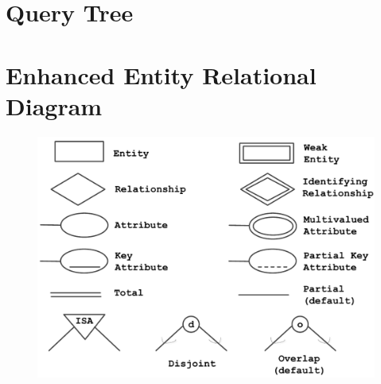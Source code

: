 \documentclass[8pt,a4paper,landscape]{extarticle}
\begin{document}
\begin{multicols*}{3}
\section*{Query Tree}

\section*{Enhanced Entity Relational Diagram}
\begin{figure}[H]
  \centering
  \includegraphics[width=0.75\linewidth]{eer.png}
  \label{fig:example}
\end{figure}
\end{multicols*}
\end{document}
